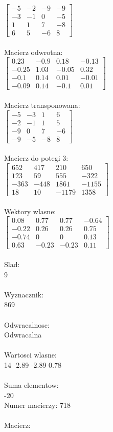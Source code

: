 \documentclass[a4paper,12pt]{article}
\begin{document}
$\begin{bmatrix} -5&-2&-9&-9\\-3&-1&0&-5\\1&1&7&-8\\6&5&-6&8 \end{bmatrix}$
\\
\\
Macierz odwrotna:\\

$\begin{bmatrix} 0.23&-0.9&0.18&-0.13\\-0.25&1.03&-0.05&0.32\\-0.1&0.14&0.01&-0.01\\-0.09&0.14&-0.1&0.01 \end{bmatrix}$
\\
\\
Macierz transponowana:\\

$\begin{bmatrix} -5&-3&1&6\\-2&-1&1&5\\-9&0&7&-6\\-9&-5&-8&8 \end{bmatrix}$
\\
\\
Macierz do potegi 3:\\

$\begin{bmatrix} 652&417&210&650\\123&59&555&-322\\-363&-448&1861&-1155\\18&10&-1179&1358 \end{bmatrix}$
\\
\\
Wektory wlasne:\\

$\begin{bmatrix} 0.08&0.77&0.77&-0.64\\-0.22&0.26&0.26&0.75\\-0.74&0&0&0.13\\0.63&-0.23&-0.23&0.11 \end{bmatrix}$
\\
\\
Slad:\\
9
\\
\\
Wyznacznik:\\
869
\\
\\
Odwracalnosc:\\
Odwracalna
\\
\\
Wartosci wlasne:\\
14 -2.89 -2.89 0.78
\\
\\
Suma elementow:\\
-20
\\
\newpage
Numer macierzy:
718
\\
\\
Macierz:\\
\end{document}
